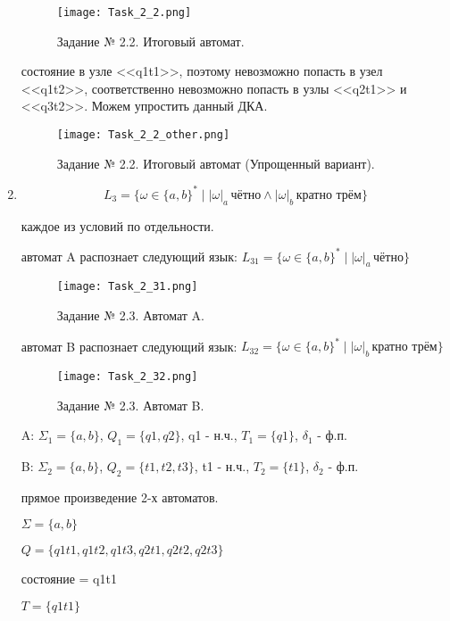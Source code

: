 \documentclass[a4paper, 12pt]{article}
\begin{document}
\begin{enumerate}
\begin{figure}[!h]
\centering
\texttt{[image: Task\_2\_2.png]}
\caption{Задание № 2.2. Итоговый автомат.}
\end{figure}

\newpage

 состояние в узле <<q1t1>>, поэтому невозможно попасть в узел <<q1t2>>, соответственно невозможно попасть в узлы <<q2t1>> и <<q3t2>>. Можем упростить данный ДКА.

\begin{figure}[!h]
\centering
\texttt{[image: Task\_2\_2\_other.png]}
\caption{Задание № 2.2. Итоговый автомат (Упрощенный вариант).}
\end{figure}

\item$$ L_3 = \{\omega \in \{a, b\}^* \mid |\omega|_a \, \text{чётно} \wedge |\omega|_b \, \text{кратно трём} \} $$

 каждое из условий по отдельности.

 автомат A распознает следующий язык: $ L_{31} = \{\omega \in \{a, b\}^* \mid |\omega|_a \, \text{чётно}\} $

\begin{figure}[!h]
\centering
\texttt{[image: Task\_2\_31.png]}
\caption{Задание № 2.3. Автомат A.}
\end{figure}

 автомат B распознает следующий язык: $ L_{32} = \{\omega \in \{a, b\}^* \mid |\omega|_b \, \text{кратно трём} \} $

\begin{figure}[!h]
\centering
\texttt{[image: Task\_2\_32.png]}
\caption{Задание № 2.3. Автомат B.}
\end{figure}

 A: $ \Sigma_1 = \{a, b\}$, $ Q_1 = \{q1, q2 \} $, q1 - н.ч., $ T_1 = \{q1 \} $, $ \delta_1 $ - ф.п.

 B: $ \Sigma_2 = \{a, b\}$, $ Q_2 = \{t1, t2, t3\} $, t1 - н.ч., $ T_2 = \{t1 \} $, $ \delta_2 $ - ф.п.

 прямое произведение 2-х автоматов.

\noindent$ \Sigma = \{a, b\}$

\noindent$ Q = \{q1t1, q1t2, q1t3, q2t1, q2t2, q2t3\} $

 состояние = q1t1

\noindent$ T = \{q1t1 \} $


\end{enumerate}
\end{document}
